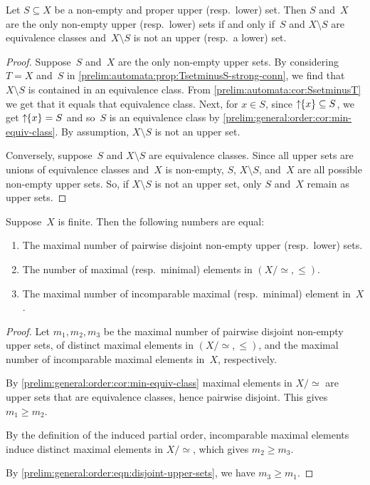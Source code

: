 \begin{proposition} \label{prelim:general:order:XS-only-uppersets}
	Let $S \subseteq X$ be a non-empty and proper upper (resp.~lower) set.
	Then $S$ and~$X$ are the only non-empty upper (resp.~lower) sets if and only
	if~$S$ and $X \setminus S$ are equivalence classes and~$X \setminus S$ is not an upper (resp.~a lower) set.
\end{proposition}
\begin{proof}
	Suppose~$S$ and~$X$ are the only non-empty upper sets.
	By considering $T = X$ and~$S$
	in  \cref{prelim:automata:prop:TsetminusS-strong-conn},
	we find that $X \setminus S$ is contained in an equivalence class.
	From \cref{prelim:automata:cor:SsetminusT} 
	we get that it equals that equivalence class.
	Next, for $x \in S$, since  $\mbox{\ensuremath{\displaystyle \uparrow \!\!\{x\}}} \subseteq S$,
	we get $\mbox{\ensuremath{\displaystyle \uparrow \!\!\{x\}}} = S$
	and so~$S$ is an equivalence class by \cref{prelim:general:order:cor:min-equiv-class}.
	By assumption, $X \setminus S$ is not an upper set.	
		
	Conversely, suppose~$S$ and $X \setminus S$ are equivalence
	classes. Since all upper sets are unions of equivalence classes and~$X$ is non-empty,
	$S$, $X \setminus S$, and~$X$ are all possible non-empty upper sets.
	So, if $X \setminus S$ is not an upper set, only $S$ and~$X$ remain as upper sets.
\end{proof}

\begin{proposition} \label{prelim:order:prop:num-disj-upper}
	Suppose~$X$ is finite. Then the following numbers are equal:
	
	\begin{enumerate}
	\item The maximal number of pairwise disjoint non-empty upper (resp.~lower) sets.
	
	\item The number of maximal (resp.~minimal) elements in $(X / {\simeq}, \le)$.
	
	\item The maximal number of incomparable maximal (resp.~minimal) element in~$X$.
	\end{enumerate}	
\end{proposition}
\begin{proof}
	Let $m_1, m_2, m_3$ be the maximal number of pairwise disjoint non-empty upper sets,
	of distinct maximal elements in $(X / {\simeq}, \le)$, 
	and the maximal number of incomparable maximal elements in~$X$, respectively.	

By \cref{prelim:general:order:cor:min-equiv-class} maximal elements in $X / {\simeq}$
are upper sets that are equivalence classes, hence pairwise disjoint.
This gives $m_1 \ge m_2$.	

By the definition of the induced partial order,
incomparable maximal elements induce
distinct maximal elements in $X / {\simeq}$, which gives $m_2 \ge m_3$.

By \cref{prelim:general:order:eqn:disjoint-upper-sets}, we have $m_3 \ge m_1$.	
\end{proof}

